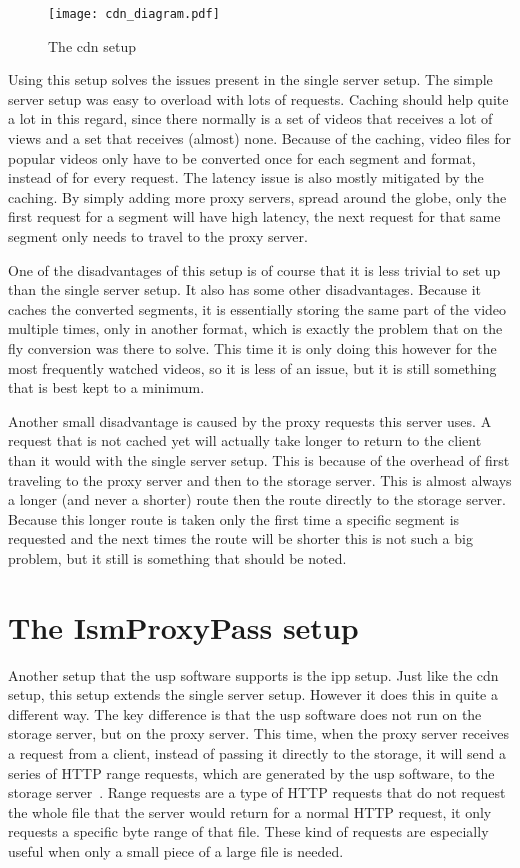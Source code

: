 \documentclass[twoside,openright]{uva-bachelor-thesis}
\begin{document}
\begin{figure}[h]
    \texttt{[image: cdn\_diagram.pdf]}
    \caption{The \gls{cdn} setup}\label{fig:cdn}
\end{figure}

Using this setup solves the issues present in the single server
setup. The simple server setup was easy to overload with lots of requests.
Caching should help quite a lot in this regard, since there normally is a set of
videos that receives a lot of views and a set that receives (almost) none.
Because of the caching, video files for popular videos only have to be converted
once for each segment and format, instead of for every request.  The latency
issue is also mostly mitigated by the caching. By simply adding more proxy
servers, spread around the globe, only the first request for a segment will have
high latency, the next request for that same segment only needs to travel to the
proxy server.

One of the disadvantages of this setup is of course that it is less trivial to
set up than the single server setup. It also has some other disadvantages.
Because it caches the converted segments, it is essentially storing the same
part of the video multiple times, only in another format, which is exactly the
problem that on the fly conversion was there to solve. This time it is only
doing this however for the most frequently watched videos, so it is less of an
issue, but it is still something that is best kept to a minimum.

Another small disadvantage is caused by the proxy requests this server uses. A
request that is not cached yet will actually take longer to return to the
client than it would with the single server setup. This is because of the
overhead of first traveling to the proxy server and then to the storage server.
This is almost always a longer (and never a shorter) route then the route
directly to the storage server. Because this longer route is taken only the
first time a specific segment is requested and the next times the route will be
shorter this is not such a big problem, but it still is something that should be
noted.


\section{The IsmProxyPass setup}
Another setup that the \gls{usp} software supports is the \gls{ipp} setup. Just
like the \gls{cdn} setup, this setup extends the single server setup. However it
does this in quite a different way. The key difference is that the \gls{usp}
software does not run on the storage server, but on the proxy server. This
time, when the proxy server receives a request from a client, instead of passing
it directly to the storage, it will send a series of HTTP range requests, which
are generated by the \gls{usp} software, to the storage
server~\autocite{rangerequests}. Range requests are a type of HTTP requests that
do not request the whole file that the server would return for a normal HTTP
request, it only requests a specific byte range of that file.  These kind of
requests are especially useful when only a small piece of a large file is
needed.
\end{document}
